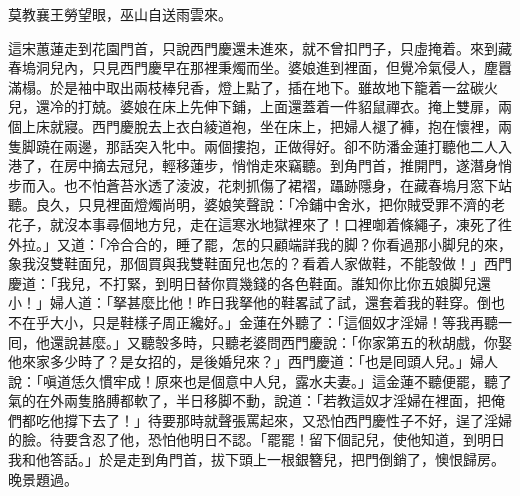 \begin{myquote} 
莫教襄王勞望眼，巫山自送雨雲來。
\end{myquote} 

這宋蕙蓮走到花園門首，只說西門慶還未進來，{}就不曾扣門子，只虛掩着。來到藏春塢洞兒內，只見西門慶早在那裡秉燭而坐。婆娘進到裡面，但覺冷氣侵人，塵囂滿榻。於是袖中取出兩枝棒兒香，燈上點了，插在地下。雖故地下籠着一盆碳火兒，還冷的打兢。婆娘在床上先伸下鋪，上面還蓋着一件貂鼠禪衣。掩上雙扉，兩個上床就寢。西門慶脫去上衣白綾道袍，坐在床上，把婦人褪了褲，抱在懷裡，兩隻脚蹺在兩邊，那話突入牝中。兩個摟抱，正做得好。卻不防潘金蓮打聽他二人入港了，在房中摘去冠兒，輕移蓮步，悄悄走來竊聽。到角門首，推開門，遂潛身悄步而入。也不怕蒼苔氷透了淩波，花刺抓傷了裙褶，躡跡隱身，在藏春塢月窓下站聽。{}良久，只見裡面燈燭尚明，婆娘笑聲說：「冷鋪中舍氷，把你賊受罪不濟的老花子，{}就沒本事尋個地方兒，走在這寒氷地獄裡來了！口裡啣着條繩子，凍死了徃外拉。」又道：「冷合合的，睡了罷，怎的只顧端詳我的脚？你看過那小脚兒的來，象我沒雙鞋面兒，那個買與我雙鞋面兒也怎的？{}看着人家做鞋，不能彀做！」西門慶道：「我兒，不打緊，到明日替你買幾錢的各色鞋面。誰知你比你五娘脚兒還小！」{}婦人道：「拏甚麼比他！昨日我拏他的鞋畧試了試，還套着我的鞋穿。倒也不在乎大小，只是鞋樣子周正纔好。」{}金蓮在外聽了：「這個奴才淫婦！等我再聽一囘，他還說甚麼。」又聽彀多時，只聽老婆問西門慶說：「你家第五的秋胡戲，你娶他來家多少時了？是女招的，是後婚兒來？」西門慶道：「也是囘頭人兒。」婦人說：「嗔道恁久慣牢成！原來也是個意中人兒，露水夫妻。」這金蓮不聽便罷，聽了氣的在外兩隻胳膊都軟了，半日移脚不動，{}說道：「若教這奴才淫婦在裡面，把俺們都吃他撐下去了！」待要那時就聲張罵起來，又恐怕西門慶性子不好，逞了淫婦的臉。待要含忍了他，恐怕他明日不認。「罷罷！留下個記兒，使他知道，到明日我和他答話。」於是走到角門首，拔下頭上一根銀簪兒，把門倒銷了，懊恨歸房。晚景題過。

